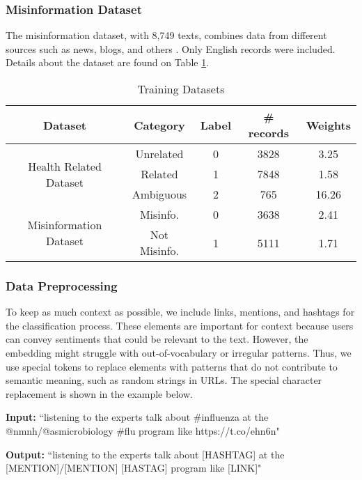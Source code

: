 \subsubsection{Misinformation Dataset}
The misinformation dataset, with 8,749 texts, combines data from different sources such as news, blogs, and others \cite{stephencrone2022,coviddata,covidunesco}. Only English records were included. Details about the dataset are found on Table \ref{table:dataset}.

\begin{table}[htbp]
	\centering
	\caption{Training Datasets}
	{\scriptsize
	\begin{tabular}{||c | c | c | c | c||} 
		\hline
		\textbf{Dataset} &
		\textbf{Category} & \textbf{Label} & \textbf{\# records} & \textbf{Weights} \\
		\hline
		\multirow{3}{6.1em}{Health Related Dataset} & Unrelated & 0 & 3828 & 3.25  \\
		& Related & 1 & 7848 & 1.58  \\ 
		& Ambiguous & 2 & 765 & 16.26 \\
		\hline
		\multirow{2}{6.1em}{Misinformation Dataset} & Misinfo. & 0 & 3638 & 2.41\\ 
		& Not Misinfo. & 1 & 5111 & 1.71 \\
		\hline
	\end{tabular}
	}
	\label{table:dataset}
\end{table}

\subsubsection{Data Preprocessing}
To keep as much context as possible, we include links, mentions, and hashtags for the classification process. These elements are important for context because users can convey sentiments that could be relevant to the text.
However, the embedding might struggle with out-of-vocabulary or irregular patterns. Thus, we use special tokens to replace elements with patterns that do not contribute
to semantic meaning, such as random strings in URLs. The special character replacement is shown in the example below.

{\footnotesize %
\begin{tcolorbox}[colback=gray!5,colframe=black!50,boxrule=0.4pt,arc=2pt,left=0.5mm,right=0.5mm,top=0.1mm,bottom=0.1mm,title=Example]
\textbf{Input:}  
``listening to the experts talk about \#influenza at the @nmnh/@asmicrobiology \#flu program like https://t.co/ehn6n"

\vspace{0.25em}
\textbf{Output:}  
``listening to the experts talk about [HASHTAG] at the [MENTION]/[MENTION] [HASTAG] program like [LINK]"
\end{tcolorbox}
}

